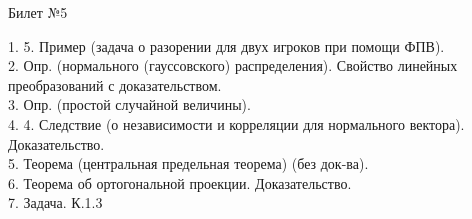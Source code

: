 \documentclass[preview]{standalone}
\begin{document}
 
\begin{center} {\Large Билет №5} \end{center} 

1. 5. Пример (задача о разорении для двух игроков при помощи ФПВ). \\

2.  Опр. (нормального (гауссовского) распределения). Свойство линейных преобразований с доказательством.\\

3.  Опр. (простой случайной величины).\\

4. 4. Следствие (о независимости и корреляции для нормального вектора). Доказательство. \\

5.  Теорема (центральная предельная теорема) (без док-ва).\\

6.  Теорема об ортогональной проекции. Доказательство.\\

7. Задача. К.1.3\\
\end{document}
